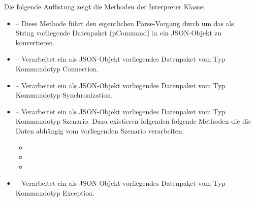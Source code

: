 \newline
Die folgende Auflistung zeigt die Methoden der Interpreter Klasse:
\begin{itemize}
	\item{} -- Diese Methode führt den eigentlichen Parse-Vorgang durch um das als String
	vorliegende Datenpaket (pCommand) in ein JSON-Objekt zu konvertieren.
	\item{} -- Verarbeitet ein als JSON-Objekt vorliegendes Datenpaket vom Typ 
	Kommandotyp Connection.
	\item{} -- Verarbeitet ein als JSON-Objekt vorliegendes Datenpaket vom 
	Typ Kommandotyp Synchronization.
	\item{} -- Verarbeitet ein als JSON-Objekt vorliegendes Datenpaket vom Typ 
	Kommandotyp Szenario. Dazu existieren folgenden folgende Methoden die die Daten abhängig vom vorliegenden Szenario verarbeiten:
	\begin{itemize}
			\item{}
			\item{}
			\item{}
	\end{itemize}
	\item{} -- Verarbeitet ein als JSON-Objekt vorliegendes Datenpaket vom Typ 
	Kommandotyp Exception.
\end{itemize}
